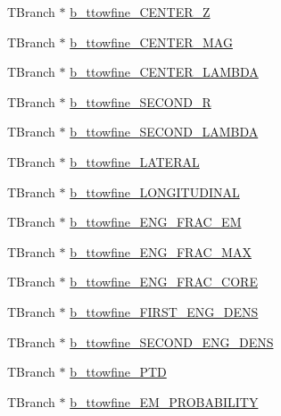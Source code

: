 \begin{DoxyCompactItemize}
\item 
T\+Branch $\ast$ \hyperlink{classJetAnalysisExample_acee53bb2d34e096b4b017f3cd0608cf7}{b\+\_\+ttowfine\+\_\+\+C\+E\+N\+T\+E\+R\+\_\+Z}
\item 
T\+Branch $\ast$ \hyperlink{classJetAnalysisExample_ab42386da672ddeaab0d11df0b7d79e9c}{b\+\_\+ttowfine\+\_\+\+C\+E\+N\+T\+E\+R\+\_\+\+M\+AG}
\item 
T\+Branch $\ast$ \hyperlink{classJetAnalysisExample_ac787a1e18b67723ee8cf49fa9e763fd3}{b\+\_\+ttowfine\+\_\+\+C\+E\+N\+T\+E\+R\+\_\+\+L\+A\+M\+B\+DA}
\item 
T\+Branch $\ast$ \hyperlink{classJetAnalysisExample_a3935ff09e8def00aff98eb9393607ff6}{b\+\_\+ttowfine\+\_\+\+S\+E\+C\+O\+N\+D\+\_\+R}
\item 
T\+Branch $\ast$ \hyperlink{classJetAnalysisExample_a061c8dd906816f3b141800dc4e3033a5}{b\+\_\+ttowfine\+\_\+\+S\+E\+C\+O\+N\+D\+\_\+\+L\+A\+M\+B\+DA}
\item 
T\+Branch $\ast$ \hyperlink{classJetAnalysisExample_ad5f696807a480623c36e21cab13c3b80}{b\+\_\+ttowfine\+\_\+\+L\+A\+T\+E\+R\+AL}
\item 
T\+Branch $\ast$ \hyperlink{classJetAnalysisExample_ad6b3673996a23068f99d2c59ee2bad6a}{b\+\_\+ttowfine\+\_\+\+L\+O\+N\+G\+I\+T\+U\+D\+I\+N\+AL}
\item 
T\+Branch $\ast$ \hyperlink{classJetAnalysisExample_abb47401de6015869b31eda091f3ed936}{b\+\_\+ttowfine\+\_\+\+E\+N\+G\+\_\+\+F\+R\+A\+C\+\_\+\+EM}
\item 
T\+Branch $\ast$ \hyperlink{classJetAnalysisExample_a8e19aa3dbce3d7801678f77c74430f5c}{b\+\_\+ttowfine\+\_\+\+E\+N\+G\+\_\+\+F\+R\+A\+C\+\_\+\+M\+AX}
\item 
T\+Branch $\ast$ \hyperlink{classJetAnalysisExample_a7b0d35ddefda2bdc9471bb87af0aa225}{b\+\_\+ttowfine\+\_\+\+E\+N\+G\+\_\+\+F\+R\+A\+C\+\_\+\+C\+O\+RE}
\item 
T\+Branch $\ast$ \hyperlink{classJetAnalysisExample_a31e51709c2fc87c72feea4977d058a6e}{b\+\_\+ttowfine\+\_\+\+F\+I\+R\+S\+T\+\_\+\+E\+N\+G\+\_\+\+D\+E\+NS}
\item 
T\+Branch $\ast$ \hyperlink{classJetAnalysisExample_a80171a753fcd4fa0efd0e6e0b0014b19}{b\+\_\+ttowfine\+\_\+\+S\+E\+C\+O\+N\+D\+\_\+\+E\+N\+G\+\_\+\+D\+E\+NS}
\item 
T\+Branch $\ast$ \hyperlink{classJetAnalysisExample_a70398e32368d09cff5e6de954cb20a45}{b\+\_\+ttowfine\+\_\+\+P\+TD}
\item 
T\+Branch $\ast$ \hyperlink{classJetAnalysisExample_a53d253ccaac9e48bf110e2acd8747a2b}{b\+\_\+ttowfine\+\_\+\+E\+M\+\_\+\+P\+R\+O\+B\+A\+B\+I\+L\+I\+TY}

\end{DoxyCompactItemize}
